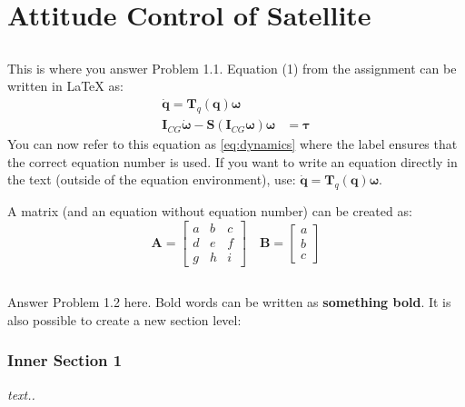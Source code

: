 \section{Attitude Control of Satellite}
\subsection{}
This is where you answer Problem 1.1. Equation (1) from the assignment can be written in \LaTeX{} as:
\begin{equation}
\label{eq:dynamics}		%
	\begin{aligned}
		\dot{\mathbf{q}} = \mathbf{T}_q (\mathbf{q} ) \boldsymbol{\omega} \\
		\mathbf{I}_{CG} \dot{\boldsymbol{\omega}} - \mathbf{S} (\mathbf{I}_{CG} \boldsymbol{\omega} ) \boldsymbol{\omega} & =  \boldsymbol{\tau}
	\end{aligned}
\end{equation}
You can now refer to this equation as \eqref{eq:dynamics} where the label ensures that the correct equation number is used. If you want to write an equation directly in the text (outside of the equation environment), use: $\dot{\mathbf{q}} = \mathbf{T}_q (\mathbf{q} ) \boldsymbol{\omega}$. %

A matrix (and an equation without equation number) can be created as:
\begin{equation*}	%
	\mathbf{A} =
	\begin{bmatrix}
		a & b & c \\ d & e & f \\ g & h & i
	\end{bmatrix} \quad
	\mathbf{B} =
	\begin{bmatrix}
		a \\ b \\ c
	\end{bmatrix}
\end{equation*}

\subsection{}
Answer Problem 1.2 here. Bold words can be written as \textbf{something bold}. It is also possible to create a new section level:
\subsubsection{Inner Section 1}
\emph{text..}

